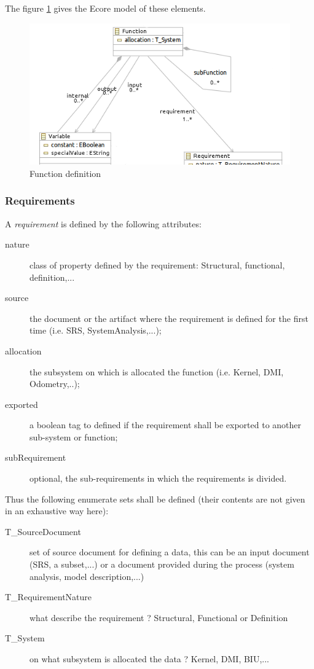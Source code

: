 The figure \ref{fig:function} gives the Ecore model of these elements.

\begin{figure}[ht]
  \centering
  \includegraphics{DataModel/Function1.png}
  \caption{Function definition}
  \label{fig:function}
\end{figure}

\subsubsection{Requirements}
\label{sec:req}

A \textit{requirement} is defined by the following attributes:
\begin{description}
\item[nature] class of property defined by the requirement: Structural, functional, definition,...
\item[source] the document or the artifact where the requirement is defined for the first time (i.e. SRS, SystemAnalysis,...);
\item[allocation] the subsystem  on which is allocated the function (i.e. Kernel, DMI, Odometry,..);
\item[exported] a boolean tag to defined if the requirement shall be exported to another sub-system or function;
\item[subRequirement] optional, the sub-requirements in which the requirements is divided.
\end{description}

Thus the following enumerate sets shall be defined (their contents are not given in an exhaustive way here):
\begin{description}

\item[T\_SourceDocument] set of source document for defining a data, this can be an input document (SRS, a subset,...) or a document provided during the process (system analysis, model description,...) 
\item[T\_RequirementNature] what describe the requirement ? Structural, Functional or Definition
\item[T\_System] on what subsystem is allocated the data ? Kernel, DMI, BIU,...
\end{description}


